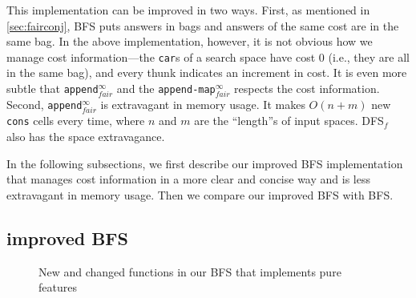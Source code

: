 \documentclass[format=acmlarge, review=true, authordraft=true]{acmart}
\newcommand{\DFSf }[0]{DFS$_{f}$}
\newcommand{\BFS}[0]{BFS}
\newcommand{\BFSser}[0]{BFS}
\newcommand{\BFSimp}[0]{our improved BFS}
\begin{document}


This implementation can be improved in two ways. First, as mentioned in 
\autoref{sec:fairconj}, \BFS{} puts answers in bags and answers of the same 
cost are in the same bag. In the above implementation, however, 
it is not obvious how we manage cost information---the \texttt{car}s of a 
search space have cost 0 (i.e., they are all in the same bag), and every thunk 
indicates an increment in cost. It is even more subtle that 
\texttt{append$^\infty_{fair}$} and the \texttt{append-map$^\infty_{fair}$} 
respects the cost information. Second, \texttt{append$^\infty_{fair}$} is 
extravagant in memory usage. It makes $O(n+m)$ new \texttt{cons} cells every 
time, where $n$ and $m$ are the ``length''s of input spaces. \DFSf{} also has 
the space extravagance.

In the following subsections, we first describe \BFSimp{} implementation that 
manages cost information in a more clear and concise way and is less 
extravagant in memory usage. Then we compare \BFSimp{} with \BFSser{}.


\subsection{improved BFS}

\begin{figure}
		
	\caption{New and changed functions in our BFS that implements pure 
	features}
	\label{BFSimp}
\end{figure}

\end{document}
